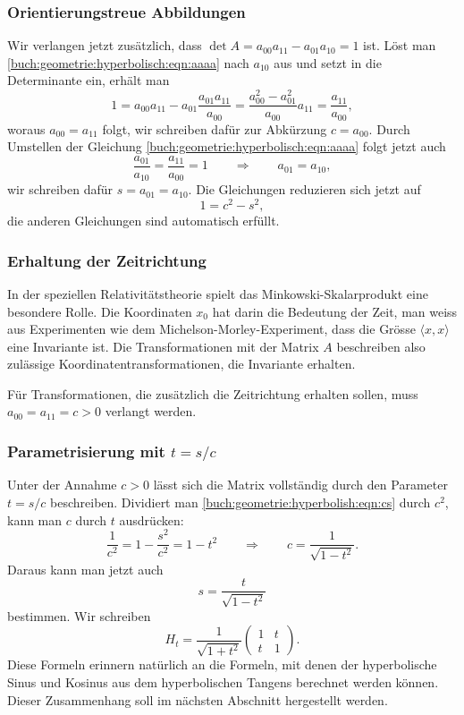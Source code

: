 \subsubsection{Orientierungstreue Abbildungen}
Wir verlangen jetzt zusätzlich, dass $\det A= a_{00}a_{11}-a_{01}{a_{10}} = 1$
ist.
Löst man \eqref{buch:geometrie:hyperbolisch:eqn:aaaa} nach $a_{10}$ aus
und setzt in die Determinante ein, erhält man
\[
1
=
a_{00}a_{11} - a_{01} \frac{a_{01}a_{11}}{a_{00}} 
=
\frac{ a_{00}^2-a_{01}^2}{a_{00}} a_{11} 
=
\frac{a_{11}}{a_{00}},
\]
woraus $a_{00}=a_{11}$ folgt, wir schreiben dafür zur Abkürzung $c=a_{00}$.
Durch Umstellen der Gleichung \eqref{buch:geometrie:hyperbolisch:eqn:aaaa}
folgt jetzt auch
\[
\frac{a_{01}}{a_{10}} = \frac{a_{11}}{a_{00}} = 1
\qquad\Rightarrow\qquad
a_{01}=a_{10},
\]
wir schreiben dafür $s=a_{01}=a_{10}$.
Die Gleichungen reduzieren sich jetzt auf
\begin{equation}
1= c^2-s^2,
\label{buch:geometrie:hyperbolish:eqn:cs}
\end{equation}
die anderen Gleichungen sind automatisch erfüllt.

\subsubsection{Erhaltung der Zeitrichtung}
In der speziellen Relativitätstheorie spielt das Minkowski-Skalarprodukt
eine besondere Rolle.
Die Koordinaten $x_0$ hat darin die Bedeutung der Zeit,
man weiss aus Experimenten wie dem Michelson-Morley-Experiment,
dass die Grösse $\langle x,x\rangle$ eine Invariante ist.
Die Transformationen mit der Matrix $A$ beschreiben also zulässige
Koordinatentransformationen, die Invariante erhalten.

Für Transformationen, die zusätzlich die Zeitrichtung erhalten sollen,
muss $a_{00}=a_{11}=c>0$ verlangt werden.

\subsubsection{Parametrisierung mit $t=s/c$}
Unter der Annahme $c>0$ lässt sich die Matrix vollständig
durch den Parameter $t=s/c$ beschreiben.
Dividiert man \eqref{buch:geometrie:hyperbolish:eqn:cs} durch $c^2$,
kann man $c$ durch $t$ ausdrücken:
\[
\frac{1}{c^2}
=
 1-\frac{s^2}{c^2}
=
1-t^2
\qquad\Rightarrow\qquad
c = \frac{1}{\sqrt{1-t^2}}.
\]
Daraus kann man jetzt auch 
\[
s=\frac{t}{\sqrt{1-t^2}}
\]
bestimmen.
Wir schreiben
\[
H_t
=
\frac{1}{\sqrt{1+t^2}}
\begin{pmatrix}
1&t\\
t&1
\end{pmatrix}.
\]
Diese Formeln erinnern natürlich an die Formeln, mit denen
der hyperbolische Sinus und Kosinus aus dem hyperbolischen
Tangens berechnet werden können.
Dieser Zusammenhang soll im nächsten Abschnitt hergestellt
werden.

